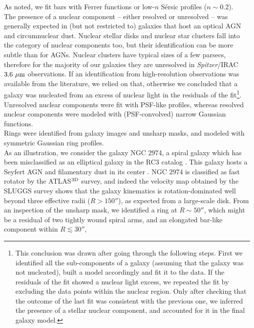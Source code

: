 \documentclass[preprint2]{emulateapj}
\begin{document}
As noted, we fit bars with Ferrer functions or low-$n$ S\'ersic profiles ($n \sim 0.2$). \\
The presence of a nuclear component -- either resolved or unresolved -- was generally expected in 
(but not restricted to) galaxies that host an optical AGN and circumnuclear dust.
Nuclear stellar disks and nuclear star clusters fall into the category of nuclear components too,
but their identification can be more subtle than for AGNs.
Nuclear clusters have typical sizes of a few parsecs, 
therefore for the majority of our galaxies they are unresolved in \emph{Spitzer}/IRAC $3.6~\rm \mu m$ observations.
If an identification from high-resolution observations was available from the literature, we relied on that, 
otherwise we concluded that a galaxy was nucleated from an excess of nuclear light in the residuals of the 
fit\footnote{This conclusion was drawn after going through the following steps. 
First we identified all the sub-components of a galaxy 
(assuming that the galaxy was not nucleated), built a model accordingly and fit it to the data.
If the residuals of the fit showed a nuclear light excess, 
we repeated the fit by excluding the data points within the nuclear region.
Only after checking that the outcome of the last fit was consistent with the previous one, 
we inferred the presence of a stellar nuclear component, and accounted for it in the final galaxy model.}.
Unresolved nuclear components were fit with PSF-like profiles,
whereas resolved nuclear components were modeled with (PSF-convolved) narrow Gaussian functions. \\
Rings were identified from galaxy images and unsharp masks, and modeled with symmetric Gaussian ring profiles. \\
As an illustration, we consider the galaxy NGC 2974, 
a spiral galaxy which has been misclassified as an elliptical galaxy in the RC3 catalog \citep{RC3}. 
This galaxy hosts a Seyfert AGN \citep{veroncettyveron2006} and filamentary dust in its center \citep{tran2001}.
NGC 2974 is classified as fast rotator by the ATLAS$^{\rm 3D}$ survey, 
and indeed the velocity map obtained by the SLUGGS survey shows that the galaxy kinematics is rotation-dominated 
well beyond three effective radii ($R>150''$), 
as expected from a large-scale disk. 
From an inspection of the unsharp mask, we identified a ring at $R \sim 50''$, 
which might be a residual of two tightly wound spiral arms,
and an elongated bar-like component within $R \lesssim 30''$,
\end{document}
